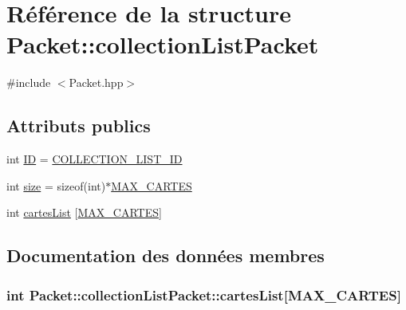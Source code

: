 \hypertarget{structPacket_1_1collectionListPacket}{}\section{Référence de la structure Packet\+:\+:collection\+List\+Packet}
\label{structPacket_1_1collectionListPacket}


{\ttfamily \#include $<$Packet.\+hpp$>$}

\subsection*{Attributs publics}
\begin{DoxyCompactItemize}
\item 
int \hyperlink{structPacket_1_1collectionListPacket_af8e389e458f39647b120772359f4799d}{I\+D} = \hyperlink{classPacket_ae91c1d355e4c8f0bef5f893747473661a257c56805034a2a1288c8b627f7c4e42}{C\+O\+L\+L\+E\+C\+T\+I\+O\+N\+\_\+\+L\+I\+S\+T\+\_\+\+I\+D}
\item 
int \hyperlink{structPacket_1_1collectionListPacket_a7e5da725f1892d00962cd8526e4959d7}{size} = sizeof(int)$\ast$\hyperlink{Packet_8hpp_a6e39296d8aea63f64e88541e9ffadc56}{M\+A\+X\+\_\+\+C\+A\+R\+T\+E\+S}
\item 
int \hyperlink{structPacket_1_1collectionListPacket_a54a300514d3c4f5e37c721db03a2afb4}{cartes\+List} \mbox{[}\hyperlink{Packet_8hpp_a6e39296d8aea63f64e88541e9ffadc56}{M\+A\+X\+\_\+\+C\+A\+R\+T\+E\+S}\mbox{]}
\end{DoxyCompactItemize}


\subsection{Documentation des données membres}
\hypertarget{structPacket_1_1collectionListPacket_a54a300514d3c4f5e37c721db03a2afb4}{}
\subsubsection[{cartes\+List}]{\setlength{\rightskip}{0pt plus 5cm}int Packet\+::collection\+List\+Packet\+::cartes\+List\mbox{[}{\bf M\+A\+X\+\_\+\+C\+A\+R\+T\+E\+S}\mbox{]}}\label{structPacket_1_1collectionListPacket_a54a300514d3c4f5e37c721db03a2afb4}
\hypertarget{structPacket_1_1collectionListPacket_af8e389e458f39647b120772359f4799d}{}
